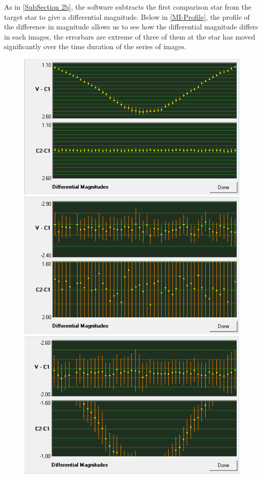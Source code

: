 \documentclass[12pt]{article}
\begin{document}
As in \cref{SubSection 2b}, the software subtracts the first comparison star from the target star to give a differential magnitude. Below in \cref{MI-Profile}, the profile of the difference in magnitude allows us to see how the differential magnitude differs in each images, the errorbars are extreme of three of them at the star has moved significantly over the time duration of the series of images.

\begin{figure}[H]
\centering
\begin{multicols}{2}
\includegraphics[scale=0.65]{Images/AsImages/MI/Sr1-Profile.PNG} \\ [0.2cm]
\includegraphics[scale=0.65]{Images/AsImages/MI/Sr3-Profile.PNG}
\includegraphics[scale=0.65]{Images/AsImages/MI/Sr2-Profile.PNG} \\ [0.2cm]

\end{multicols}
\end{figure}
\end{document}
